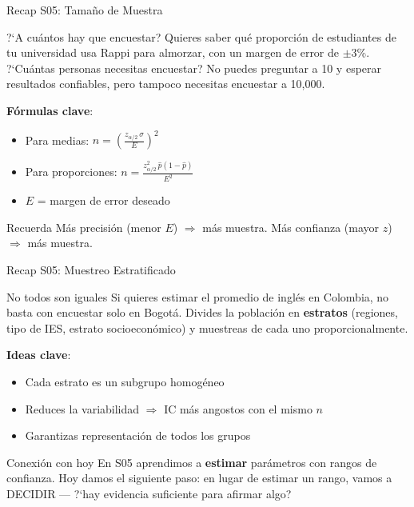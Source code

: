 \documentclass[aspectratio=169, 11pt]{beamer}
\begin{document}
\begin{frame}{Recap S05: Tama\~no de Muestra}
\small
\begin{exampleblock}{?`A cu\'antos hay que encuestar?}
Quieres saber qu\'e proporci\'on de estudiantes de tu universidad usa Rappi para almorzar, con un margen de error de $\pm$3\%. ?`Cu\'antas personas necesitas encuestar? No puedes preguntar a 10 y esperar resultados confiables, pero tampoco necesitas encuestar a 10{,}000.
\end{exampleblock}

\vspace{0.2cm}
\textbf{F\'ormulas clave}:
\begin{itemize}\setlength{\itemsep}{1pt}
  \item Para medias: $n = \left(\frac{z_{\alpha/2}\,\sigma}{E}\right)^2$
  \item Para proporciones: $n = \frac{z_{\alpha/2}^2\,\hat{p}(1-\hat{p})}{E^2}$
  \item $E$ = margen de error deseado
\end{itemize}

\vspace{0.1cm}
\begin{alertblock}{Recuerda}
M\'as precisi\'on (menor $E$) $\Rightarrow$ m\'as muestra. M\'as confianza (mayor $z$) $\Rightarrow$ m\'as muestra.
\end{alertblock}
\end{frame}

\begin{frame}{Recap S05: Muestreo Estratificado}
\small
\begin{exampleblock}{No todos son iguales}
Si quieres estimar el promedio de ingl\'es en Colombia, no basta con encuestar solo en Bogot\'a. Divides la poblaci\'on en \textbf{estratos} (regiones, tipo de IES, estrato socioecon\'omico) y muestreas de cada uno proporcionalmente.
\end{exampleblock}

\vspace{0.2cm}
\textbf{Ideas clave}:
\begin{itemize}\setlength{\itemsep}{1pt}
  \item Cada estrato es un subgrupo homog\'eneo
  \item Reduces la variabilidad $\Rightarrow$ IC m\'as angostos con el mismo $n$
  \item Garantizas representaci\'on de todos los grupos
\end{itemize}

\vspace{0.2cm}
\begin{block}{Conexi\'on con hoy}
En S05 aprendimos a \textbf{estimar} par\'ametros con rangos de confianza. Hoy damos el siguiente paso: en lugar de estimar un rango, vamos a \alert{DECIDIR} --- ?`hay evidencia suficiente para afirmar algo?
\end{block}
\end{frame}
\end{document}
